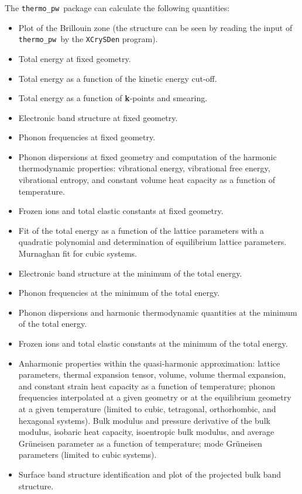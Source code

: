 \documentclass[12pt,a4paper]{article}
\def\thermo{\texttt{thermo\_pw}}
\begin{document}
The \thermo\ package can calculate the following quantities:
\begin{itemize}
\item Plot of the Brillouin zone (the structure can be seen by reading the
input of \thermo\ by the \texttt{XCrySDen} program).

\item Total energy at fixed geometry.

\item Total energy as a function of the kinetic energy cut-off.

\item Total energy as a function of {\bf k}-points and smearing.

\item Electronic band structure at fixed geometry.

\item Phonon frequencies at fixed geometry.

\item Phonon dispersions at fixed geometry and computation of the harmonic
thermodynamic properties: vibrational energy, vibrational free energy,
vibrational entropy, and constant volume heat capacity as a function of
temperature.

\item Frozen ions and total elastic constants at fixed geometry.

\item Fit of the total energy as a function of the lattice parameters with
a quadratic polynomial and determination of equilibrium lattice parameters.
Murnaghan fit for cubic systems.

\item Electronic band structure at the minimum of the total energy.

\item Phonon frequencies at the minimum of the total energy.

\item Phonon dispersions and harmonic thermodynamic quantities
at the minimum of the total energy.

\item Frozen ions and total elastic constants at the minimum of the total
energy.

\item Anharmonic properties within the quasi-harmonic approximation: 
lattice parameters, thermal expansion tensor, volume, volume thermal 
expansion, and constant strain heat capacity as a function of temperature; 
phonon frequencies interpolated at a given
geometry or at the equilibrium geometry at a given temperature
(limited to cubic, tetragonal, orthorhombic, and hexagonal systems).
Bulk modulus and pressure derivative of the bulk modulus, isobaric heat 
capacity, isoentropic bulk modulus, and average Gr\"uneisen parameter as 
a function of temperature; mode Gr\"uneisen parameters
(limited to cubic systems).

\item Surface band structure identification and plot of the projected bulk
band structure.

\end{itemize}
\end{document}

